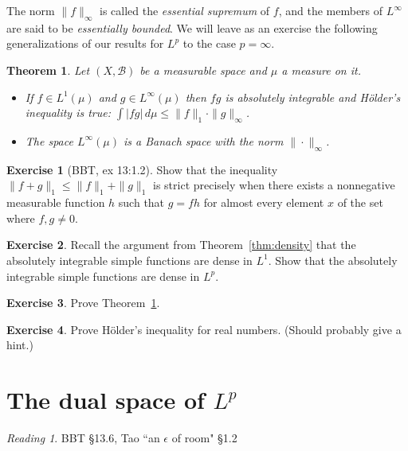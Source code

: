 \documentclass[11pt,oneside]{amsbook}
\theoremstyle{definition}
\newtheorem{exerc}{Exercise}[section]
\theoremstyle{plain}
\newtheorem{thm}{Theorem}[section]
\theoremstyle{definition}
\theoremstyle{remark}
\newtheorem*{reading}{Reading}
\numberwithin{equation}{section}
\numberwithin{figure}{section}
\begin{document}
The norm $\|f\|_\infty$ is called the \emph{essential supremum} of $f$, and the members of $L^\infty$ are said to be \emph{essentially bounded}. We will leave as an exercise the following generalizations of our results for $L^p$ to the case $p=\infty$.

\begin{thm}
  \label{thm:L-infty}
  Let $(X,\mathcal B)$ be a measurable space and $\mu$ a measure on it.
  \begin{itemize}
  \item If $f\in L^1(\mu)$ and $g\in L^\infty(\mu)$ then $fg$ is absolutely integrable and H\"older's inequality is true: $\int|fg|\,d\mu\leq\|f\|_1\cdot\|g\|_\infty$.
  \item The space $L^\infty(\mu)$ is a Banach space with the norm $\|\cdot\|_\infty$.
  \end{itemize}
\end{thm}

\begin{exerc}[BBT, ex 13:1.2]
  Show that the inequality $\|f+g\|_1\leq\|f\|_1+\|g\|_1$ is strict precisely when there exists a nonnegative measurable function $h$ such that $g=fh$ for almost every element $x$ of the set where $f,g\neq0$.
\end{exerc}

\begin{exerc}
  Recall the argument from Theorem~\ref{thm:density} that the absolutely integrable simple functions are dense in $L^1$. Show that the absolutely integrable simple functions are dense in $L^p$.
\end{exerc}

\begin{exerc}
  Prove Theorem~\ref{thm:L-infty}.
\end{exerc}

\begin{exerc}
  Prove H\"older's inequality for real numbers. (Should probably give a hint.)
\end{exerc}

\newpage
\section{The dual space of $L^p$}

\begin{reading}
  BBT \S 13.6, Tao ``an $\epsilon$ of room" \S 1.2
\end{reading}
\end{document}
